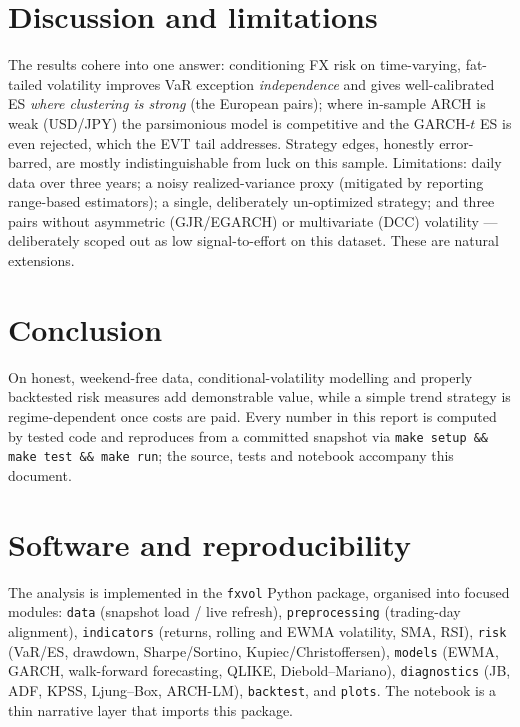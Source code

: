\documentclass[11pt,a4paper]{article}
\begin{document}
\section{Discussion and limitations}
The results cohere into one answer: conditioning FX risk on time-varying, fat-tailed volatility
improves VaR exception \emph{independence} and gives well-calibrated ES \emph{where clustering is strong}
(the European pairs); where in-sample ARCH is weak (USD/JPY) the parsimonious model is competitive and the
GARCH-$t$ ES is even rejected, which the EVT tail addresses. Strategy edges, honestly error-barred, are
mostly indistinguishable from luck on this sample. Limitations: daily data over three years; a noisy
realized-variance proxy (mitigated by reporting range-based estimators); a single, deliberately
un-optimized strategy; and three pairs without asymmetric (GJR/EGARCH) or multivariate (DCC) volatility ---
deliberately scoped out as low signal-to-effort on this dataset. These are natural extensions.
\section{Conclusion}
On honest, weekend-free data, conditional-volatility modelling and properly backtested risk measures
add demonstrable value, while a simple trend strategy is regime-dependent once costs are paid. Every
number in this report is computed by tested code and reproduces from a committed snapshot via
\texttt{make setup \&\& make test \&\& make run}; the source, tests and notebook accompany this document.
\appendix
\section{Software and reproducibility}
The analysis is implemented in the \texttt{fxvol} Python package, organised into focused modules:
\texttt{data} (snapshot load / live refresh), \texttt{preprocessing} (trading-day alignment),
\texttt{indicators} (returns, rolling and EWMA volatility, SMA, RSI), \texttt{risk} (VaR/ES, drawdown,
Sharpe/Sortino, Kupiec/Christoffersen), \texttt{models} (EWMA, GARCH, walk-forward forecasting, QLIKE,
Diebold--Mariano), \texttt{diagnostics} (JB, ADF, KPSS, Ljung--Box, ARCH-LM), \texttt{backtest}, and
\texttt{plots}. The notebook is a thin narrative layer that imports this package.
\end{document}
